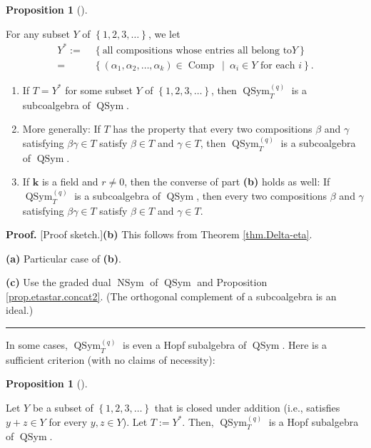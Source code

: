 \documentclass[numbers=enddot,12pt,final,onecolumn,notitlepage]{scrartcl}%
\theoremstyle{definition}
\newtheorem{prop}[theo]{Proposition}
\newenvironment{proposition}[1][]
{\begin{prop}[#1]\begin{leftbar}}
{\end{leftbar}\end{prop}}
\newenvironment{proof}[1][Proof]{\noindent\textbf{#1.} }{\ \rule{0.5em}{0.5em}}
\begin{document}
\begin{proposition}
\label{prop.app.subalg.subcoalg}For any subset $Y$ of $\left\{  1,2,3,\ldots
\right\}  $, we let%
\begin{align*}
Y^{\ast}:=\  &  \left\{  \text{all compositions whose entries all belong to
}Y\right\} \\
=\  &  \left\{  \left(  \alpha_{1},\alpha_{2},\ldots,\alpha_{k}\right)
\in\operatorname*{Comp}\ \mid\ \alpha_{i}\in Y\text{ for each }i\right\}  .
\end{align*}


\begin{enumerate}
\item[\textbf{(a)}] If $T=Y^{\ast}$ for some subset $Y$ of $\left\{
1,2,3,\ldots\right\}  $, then $\operatorname*{QSym}\nolimits_{T}^{\left(
q\right)  }$ is a subcoalgebra of $\operatorname*{QSym}$.

\item[\textbf{(b)}] More generally: If $T$ has the property that every two
compositions $\beta$ and $\gamma$ satisfying $\beta\gamma\in T$ satisfy
$\beta\in T$ and $\gamma\in T$, then $\operatorname*{QSym}\nolimits_{T}%
^{\left(  q\right)  }$ is a subcoalgebra of $\operatorname*{QSym}$.

\item[\textbf{(c)}] If $\mathbf{k}$ is a field and $r\neq0$, then the converse
of part \textbf{(b)} holds as well: If $\operatorname*{QSym}\nolimits_{T}%
^{\left(  q\right)  }$ is a subcoalgebra of $\operatorname*{QSym}$, then every
two compositions $\beta$ and $\gamma$ satisfying $\beta\gamma\in T$ satisfy
$\beta\in T$ and $\gamma\in T$.
\end{enumerate}
\end{proposition}

\begin{proof}
[Proof sketch.]\textbf{(b)} This follows from Theorem \ref{thm.Delta-eta}.

\textbf{(a)} Particular case of \textbf{(b)}.

\textbf{(c)} Use the graded dual $\operatorname*{NSym}$ of
$\operatorname*{QSym}$ and Proposition \ref{prop.etastar.concat2}. (The
orthogonal complement of a subcoalgebra is an ideal.)
\end{proof}

In some cases, $\operatorname*{QSym}\nolimits_{T}^{\left(  q\right)  }$ is
even a Hopf subalgebra of $\operatorname*{QSym}$. Here is a sufficient
criterion (with no claims of necessity):

\begin{proposition}
\label{prop.app.subalg.subhopf.Y+Y}Let $Y$ be a subset of $\left\{
1,2,3,\ldots\right\}  $ that is closed under addition (i.e., satisfies $y+z\in
Y$ for every $y,z\in Y$). Let $T:=Y^{\ast}$. Then, $\operatorname*{QSym}%
\nolimits_{T}^{\left(  q\right)  }$ is a Hopf subalgebra of
$\operatorname*{QSym}$.
\end{proposition}
\end{document}
